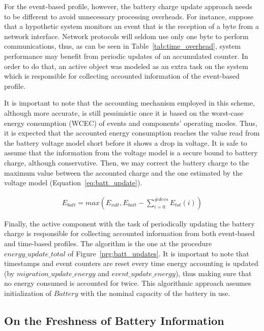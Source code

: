 

For the event-based profile, however, the battery charge update approach needs
to be different to avoid unnecessary processing overheads. For instance, suppose
that a hypothetic system monitors an event that is the reception of a byte from
a network interface. Network protocols will seldom use only one byte to perform
communications, thus, as can be seen in Table~\ref{tab:time_overhead}, system
performance may benefit from periodic updates of an accumulated counter. In
order to do that, an active object was modeled as an extra task on the system
which is responsible for collecting accounted information of the event-based
profile.

It is important to note that the accounting mechanism employed in this scheme,
although more accurate, is still pessimistic once it is based on the worst-case
energy consumption (WCEC) of events and components' operating modes. Thus, it is
expected that the accounted energy consumption reaches the value read from the
battery voltage model short before it shows a drop in voltage. It is safe to
assume that the information from the voltage model is a secure bound to battery
charge, although conservative. Then, we may correct the battery charge to the
maximum value between the accounted charge and the one estimated by the voltage
model (Equation~\ref{eq:batt_update}).

\begin{eqnarray}
E_{batt} = max\left(E_{volt} , E_{batt} - \sum_{i = 0}^{\#devs} E_{tot}(i)\right)
\label{eq:batt_update}
\end{eqnarray}

Finally, the active component with the task of periodically updating the battery
charge is responsible for collecting accounted information from both event-based
and time-based profiles. The algorithm is the one at the procedure
$energy\_update\_total$ of Figure~\ref{prg:batt_updates}. It is important to
note that timestamps and event counters are reset every time energy accounting
is updated (by $migration\_update\_energy$ and $event\_update\_energy$), thus
making sure that no energy consumed is accounted for twice. This algorithmic
approach assumes initialization of $Battery$ with the nominal capacity of the
battery in use.


\subsection{On the Freshness of Battery Information}
\label{sec:frequency}

